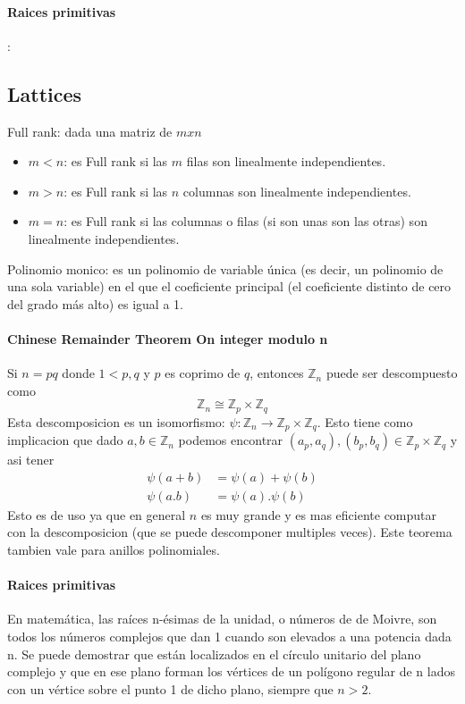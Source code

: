 \documentclass[12pt, oneside]{article}
\newcommand{\Z}{\mathbb{Z}}
\begin{document}
\vspace{0.3cm}
\paragraph{Raices primitivas}:

\subsection{Lattices}

Full rank: dada una matriz de $m x n$
\begin{itemize}
  \item $m<n$: es Full rank si las $m$ filas son linealmente independientes.
  \item $m>n$: es Full rank si las $n$ columnas son linealmente independientes.
  \item $m=n$: es Full rank si las columnas o filas (si son unas son las otras) son
    linealmente independientes.
\end{itemize}

Polinomio monico:
es un polinomio de variable única (es decir, un polinomio de una sola variable)
en el que el coeficiente principal (el coeficiente distinto de cero del grado más alto) es igual a 1.

\paragraph{Chinese Remainder Theorem On integer modulo n}
Si $n=pq$  donde $1<p,q$ y $p$ es coprimo de $q$, entonces $\Z_n$ puede ser descompuesto como
\begin{equation*}
  \Z_n \cong \Z_p\times \Z_q
\end{equation*}
Esta descomposicion es un isomorfismo: $\psi:\Z_n\to\Z_p\times\Z_q$.
Esto tiene como implicacion que dado $a,b \in\Z_n$ podemos encontrar $(a_p,a_q),(b_p,b_q)\in\Z_p\times\Z_q$
y asi tener
\begin{align}
  \psi(a+b)&=\psi(a)+\psi(b)\\
  \psi(a.b)&=\psi(a).\psi(b)
\end{align}
Esto es de uso ya que en general $n$ es muy grande y es mas eficiente
computar con la descomposicion (que se puede descomponer multiples veces).
Este teorema tambien vale para anillos polinomiales.

\paragraph{Raices primitivas}
En matemática, las raíces n-ésimas de la unidad, o números de de Moivre,
son todos los números complejos que dan 1 cuando son elevados a una potencia dada n.
Se puede demostrar que están localizados en el círculo unitario del plano complejo y
que en ese plano forman los vértices de un polígono regular de n lados con un vértice
sobre el punto 1 de dicho plano, siempre que $n>2$.
\end{document}
